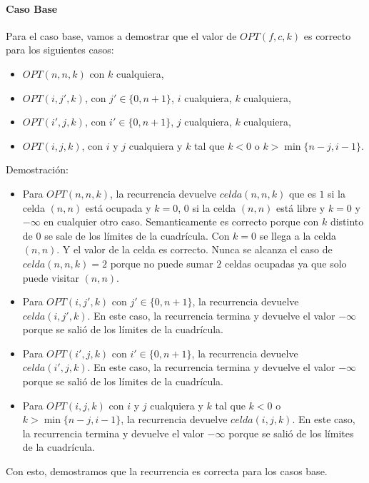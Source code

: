 \paragraph{Caso Base} 
Para el caso base, vamos a demostrar que el valor de $OPT(f,c,k)$ es correcto para los siguientes casos:
\begin{itemize}
    \item $OPT(n,n,k)$ con $k$ cualquiera,
    \item $OPT(i, j', k)$, con $j' \in \{0, n+1\}$, $i$ cualquiera, $k$ cualquiera,
    \item $OPT(i', j, k)$, con $i' \in \{0, n+1\}$, $j$ cualquiera, $k$ cualquiera,
    \item $OPT(i, j, k)$, con $i$ y $j$ cualquiera y $k$ tal que $k < 0$ o $k > \min\{n - j, i - 1\}$.
\end{itemize}

Demostración: 
\begin{itemize}
    \item Para $OPT(n, n, k)$, la recurrencia devuelve $celda(n,n, k)$ que es $1$ si la celda $(n, n)$ está ocupada y $k = 0$, $0$ si la celda $(n, n)$ está libre y $k = 0$ y $-\infty$ en cualquier otro caso. Semanticamente es correcto porque con $k$ distinto de $0$ se sale de los límites de la cuadrícula. Con $k = 0$ se llega a la celda $(n, n)$. Y el valor de la celda es correcto. Nunca se alcanza el caso de $celda(n, n, k) = 2$ porque no puede sumar $2$ celdas ocupadas ya que solo puede visitar $(n, n)$.

    \item Para $OPT(i, j', k)$ con $j' \in \{0, n+1\}$, la recurrencia devuelve $celda(i, j', k)$. En este caso, la recurrencia termina y devuelve el valor $-\infty$ porque se salió de los límites de la cuadrícula.

    \item Para $OPT(i', j, k)$ con $i' \in \{0, n+1\}$, la recurrencia devuelve $celda(i', j, k)$. En este caso, la recurrencia termina y devuelve el valor $-\infty$ porque se salió de los límites de la cuadrícula.

    \item Para $OPT(i, j, k)$ con $i$ y $j$ cualquiera y $k$ tal que $k < 0$ o $k > \min\{n - j, i - 1\}$, la recurrencia devuelve $celda(i, j, k)$. En este caso, la recurrencia termina y devuelve el valor $-\infty$ porque se salió de los límites de la cuadrícula.
\end{itemize}

Con esto, demostramos que la recurrencia es correcta para los casos base.

